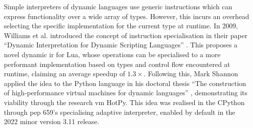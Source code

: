 Simple interpreters of dynamic languages use generic instructions which can express functionality over a wide array of types. However, this incurs an overhead selecting the specific implementation for the current type at runtime.
In 2009, Williams et al. introduced the concept of instruction specialisation in their paper ``Dynamic Interpretation for Dynamic Scripting Languages'' \cite{williamsDynamicInterpretationDynamic2010}.
This proposes a novel dynamic \ac{ir} for Lua, whose operations can be specialised to a more performant implementation based on types and control flow encountered at runtime, claiming an average speedup of $1.3\times$.
Following this, Mark Shannon applied the idea to the Python language in his doctoral thesis ``The construction of high-performance virtual
machines for dynamic languages'' \cite{shannonConstructionHighperformanceVirtual2011}, demonstrating its viability through the research \ac{vm} HotPy.
This idea was realised in the CPython through \ac{pep} 659's specialising adaptive interpreter, enabled by default in the 2022 minor version 3.11 release.

